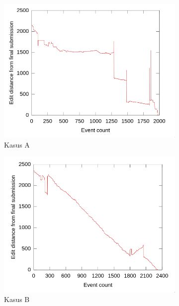 \begin{figure}
  \begin{subfigure}{.5\linewidth}
    \centering
    \includegraphics[scale=.25]{img/ed-a}
    \caption{Kasus A}\label{fig:edit-distance-a}
  \end{subfigure}%
  \begin{subfigure}{.5\linewidth}
    \centering
    \includegraphics[scale=.25]{img/ed-b}
    \caption{Kasus B}\label{fig:edit-distance-b}
  \end{subfigure}\\[1ex]
  \begin{subfigure}{\linewidth}

\end{subfigure}
\end{figure}
